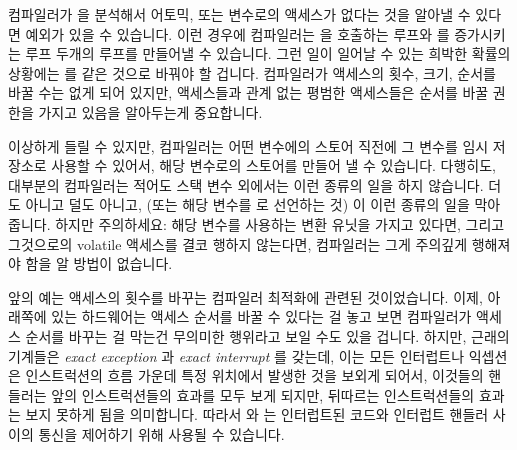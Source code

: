 컴파일러가  을 분석해서 어토믹, 또는  변수로의
액세스가 없다는 것을 알아낼 수 있다면 예외가 있을 수 있습니다.
이런 경우에 컴파일러는  을 호출하는 루프와  를
증가시키는 루프 두개의 루프를 만들어낼 수 있습니다.
그런 일이 일어날 수 있는 희박한 확률의 상황에는  를
 같은 것으로 바꿔야 할 겁니다.
컴파일러가  액세스의 횟수, 크기, 순서를 바꿀 수는 없게 되어
있지만,  액세스들과 관계 없는 평범한 액세스들은 순서를 바꿀 권한을
가지고 있음을 알아두는게 중요합니다.

이상하게 들릴 수 있지만, 컴파일러는 어떤 변수에의 스토어 직전에 그 변수를 임시
저장소로 사용할 수 있어서, 해당 변수로의 스토어를 만들어 낼 수 있습니다.
다행히도, 대부분의 컴파일러는 적어도 스택 변수 외에서는 이런 종류의 일을 하지
않습니다.
더도 아니고 덜도 아니고,  (또는 해당 변수를  로
선언하는 것) 이 이런 종류의 일을 막아줍니다.
하지만 주의하세요: 해당 변수를 사용하는 변환 유닛을 가지고 있다면, 그리고
그것으로의 volatile 액세스를 결코 행하지 않는다면, 컴파일러는 그게 주의깊게
행해져야 함을 알 방법이 없습니다.

앞의 예는 액세스의 횟수를 바꾸는 컴파일러 최적화에 관련된 것이었습니다.
이제, 아래쪽에 있는 하드웨어는 액세스 순서를 바꿀 수 있다는 걸 놓고 보면
컴파일러가 액세스 순서를 바꾸는 걸 막는건 무의미한 행위라고 보일 수도 있을
겁니다.
하지만, 근래의 기계들은 \emph{exact exception} 과 \emph{exact interrupt} 를
갖는데, 이는 모든 인터럽트나 익셉션은 인스트럭션의 흐름 가운데 특정 위치에서
발생한 것을 보외게 되어서, 이것들의 핸들러는 앞의 인스트럭션들의 효과를 모두
보게 되지만, 뒤따르는 인스트럭션들의 효과는 보지 못하게 됨을 의미합니다.
따라서  와  는 인터럽트된 코드와 인터럽트
핸들러 사이의 통신을 제어하기 위해 사용될 수 있습니다.
\iffalse

